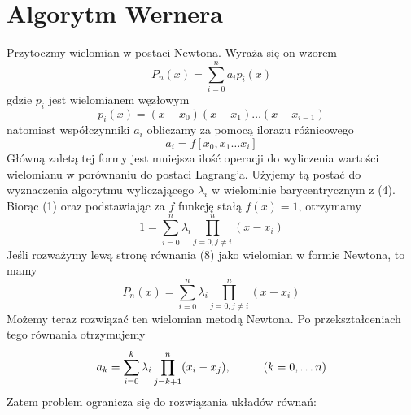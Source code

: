 \documentclass[11pt, wide]{article}
\begin{document}
\section{Algorytm Wernera}\label{werner}
Przytoczmy wielomian w postaci Newtona. Wyraża się on wzorem
\begin{equation}
    P_n(x) = \sum_{i=0}^{n}a_i p_i(x)
\end{equation}
gdzie $p_i$ jest wielomianem węzłowym
\begin{equation*}
    p_i(x) = (x - x_0)(x - x_1)\ldots(x - x_{i-1})
\end{equation*}
natomiast współczynniki $a_i$ obliczamy za pomocą ilorazu różnicowego
\begin{equation*}
    a_i = f[x_0,x_1\ldots x_i]
\end{equation*}
Główną zaletą tej formy jest mniejsza ilość operacji do wyliczenia wartości
wielomianu w porównaniu do postaci Lagrang'a. Użyjemy tą postać do wyznaczenia algorytmu
wyliczającego $\lambda_i$ w wielominie barycentrycznym z (4).
\\
Biorąc (1) oraz podstawiając za $f$ funkcję stałą $f(x) = 1$, otrzymamy
\begin{equation}
    1 = \sum_{i = 0}^n\lambda_i\prod_{j=0,j\neq i}^{n}(x - x_i)
\end{equation}
Jeśli rozważymy lewą stronę równania (8) jako wielomian w formie Newtona, to mamy
\begin{equation*}
    P_n(x) = \sum_{i = 0}^n\lambda_i\prod_{j=0,j\neq i}^{n}(x - x_i)
\end{equation*}
Możemy teraz rozwiązać ten wielomian metodą Newtona.
Po przekształceniach tego równania otrzymujemy
\begin{equation*}
    a_k = \sum_{i=0}^{k}\lambda_i\prod_{j=k+1}^{n}(x_i - x_j),\hspace*{1cm} (k = 0, \ldots n)
\end{equation*}
Zatem problem ogranicza się do rozwiązania układów równań:
\end{document}
